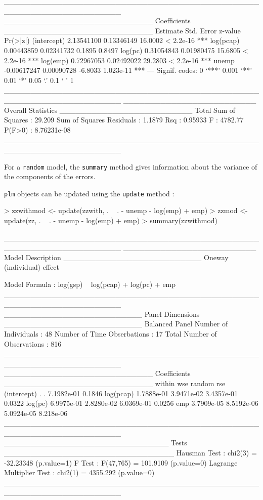 \documentclass{article}
\begin{document}
\begin{Schunk}
\begin{Soutput}
______________________________________________________________________ 
____________________________ Coefficients ____________________________
               Estimate  Std. Error z-value  Pr(>|z|)    
(intercept)  2.13541100  0.13346149 16.0002 < 2.2e-16 ***
log(pcap)    0.00443859  0.02341732  0.1895    0.8497    
log(pc)      0.31054843  0.01980475 15.6805 < 2.2e-16 ***
log(emp)     0.72967053  0.02492022 29.2803 < 2.2e-16 ***
unemp       -0.00617247  0.00090728 -6.8033 1.023e-11 ***
---
Signif. codes:  0 ‘***’ 0.001 ‘**’ 0.01 ‘*’ 0.05 ‘.’ 0.1 ‘ ’ 1 
______________________________________________________________________ 
_________________________ Overall Statistics _________________________
Total Sum of Squares       : 29.209
Sum of Squares Residuals   : 1.1879
Rsq                        : 0.95933
F                          : 4782.77
P(F>0)                     : 8.76231e-08
______________________________________________________________________ 
\end{Soutput}
\end{Schunk}

For a \texttt{random} model, the \texttt{summary} method gives
information about the variance of the components of the errors.

\texttt{plm} objects can be updated using the \texttt{update} method :

\begin{Schunk}
\begin{Sinput}
> zzwithmod <- update(zzwith, . ~ . - unemp - log(emp) + emp)
> zzmod <- update(zz, . ~ . - unemp - log(emp) + emp)
> summary(zzwithmod)
\end{Sinput}
\begin{Soutput}
______________________________________________________________________ 
_________________________ Model Description __________________________
Oneway (individual) effect

Model Formula        : log(gsp) ~ log(pcap) + log(pc) + emp
______________________________________________________________________ 
__________________________ Panel Dimensions __________________________
Balanced Panel
Number of Individuals        :  48
Number of Time Obserbations  :  17
Total Number of Observations :  816
______________________________________________________________________ 
____________________________ Coefficients ____________________________
                within        wse     random       rse
(intercept)          .          . 7.1982e-01    0.1846
log(pcap)   1.7888e-01 3.9471e-02 3.4357e-01    0.0322
log(pc)     6.9975e-01 2.8280e-02 6.0369e-01    0.0256
emp         3.7909e-05 8.5192e-06 5.0924e-05 8.218e-06
______________________________________________________________________ 
_______________________________ Tests ________________________________
Hausman Test                   : chi2(3) = -32.23348 (p.value=1)
F Test                         : F(47,765) = 101.9109 (p.value=0)
Lagrange Multiplier Test       : chi2(1) = 4355.292 (p.value=0)
______________________________________________________________________ 
\end{Soutput}
\end{Schunk}
\end{document}
